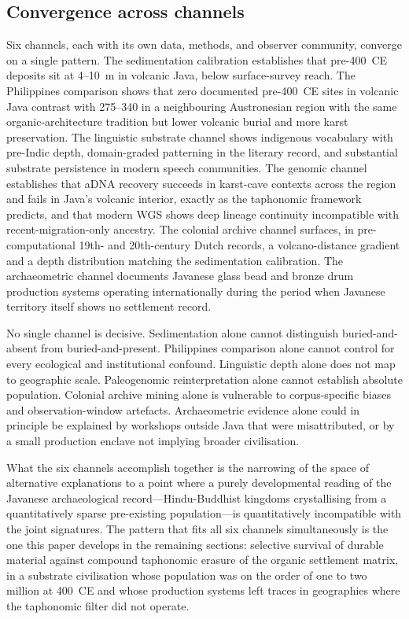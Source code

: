 \documentclass[12pt,a4paper]{article}
\begin{document}
\subsection{Convergence across channels}
\label{sec:convergence}

Six channels, each with its own data, methods, and observer community, converge on a single pattern. The sedimentation calibration establishes that pre-400~CE deposits sit at 4--10~m in volcanic Java, below surface-survey reach. The Philippines comparison shows that zero documented pre-400~CE sites in volcanic Java contrast with 275--340 in a neighbouring Austronesian region with the same organic-architecture tradition but lower volcanic burial and more karst preservation. The linguistic substrate channel shows indigenous vocabulary with pre-Indic depth, domain-graded patterning in the literary record, and substantial substrate persistence in modern speech communities. The genomic channel establishes that aDNA recovery succeeds in karst-cave contexts across the region and fails in Java's volcanic interior, exactly as the taphonomic framework predicts, and that modern WGS shows deep lineage continuity incompatible with recent-migration-only ancestry. The colonial archive channel surfaces, in pre-computational 19th- and 20th-century Dutch records, a volcano-distance gradient and a depth distribution matching the sedimentation calibration. The archaeometric channel documents Javanese glass bead and bronze drum production systems operating internationally during the period when Javanese territory itself shows no settlement record.

No single channel is decisive. Sedimentation alone cannot distinguish buried-and-absent from buried-and-present. Philippines comparison alone cannot control for every ecological and institutional confound. Linguistic depth alone does not map to geographic scale. Paleogenomic reinterpretation alone cannot establish absolute population. Colonial archive mining alone is vulnerable to corpus-specific biases and observation-window artefacts. Archaeometric evidence alone could in principle be explained by workshops outside Java that were misattributed, or by a small production enclave not implying broader civilisation.

What the six channels accomplish together is the narrowing of the space of alternative explanations to a point where a purely developmental reading of the Javanese archaeological record---Hindu-Buddhist kingdoms crystallising from a quantitatively sparse pre-existing population---is quantitatively incompatible with the joint signatures. The pattern that fits all six channels simultaneously is the one this paper develops in the remaining sections: selective survival of durable material against compound taphonomic erasure of the organic settlement matrix, in a substrate civilisation whose population was on the order of one to two million at 400~CE and whose production systems left traces in geographies where the taphonomic filter did not operate.
\end{document}
